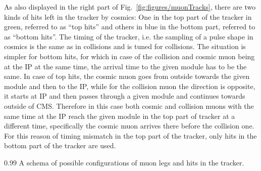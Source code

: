 As also displayed in the right part of Fig.~\ref{fig:figures/muonTracks}, there are two kinds of hits left in the tracker by cosmics: One in the top part of the tracker in green, referred to as ``top hits'' and others in blue in the bottom part, referred to as ``bottom hits''. The timing of the tracker, i.e. the sampling of a pulse shape in cosmics is the same as in collisions and is tuned for collisions.  The situation is simpler for bottom hits, for which in case of the collision and cosmic muon being at the IP at the same time, the arrival time to the given module has to be the same. In case of top hits, the cosmic muon goes from outside towards the given module and then to the IP, while for the collision muon the direction is opposite, it starts at IP and then passes through a given module and continues towards outside of CMS. Therefore in this case both cosmic and collision muons with the same time at the IP reach the given module in the top part of tracker at a different time, specifically the cosmic muon arrives there before the collision one. For this reason of timing mismatch in the top part of the tracker, only hits in the bottom part of the tracker are used.

                 {0.99}       %
                 { A schema of possible configurations of muon legs and hits in the tracker. }


